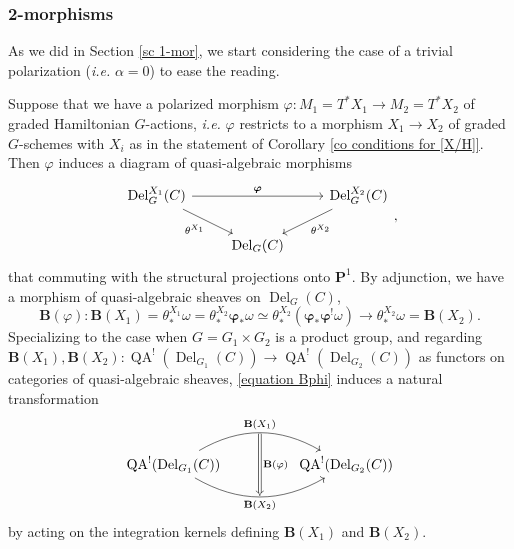 \documentclass[11pt, a4paper]{amsart}
\numberwithin{equation}{section}
\theoremstyle{definition}
\theoremstyle{remark}
\DeclareMathOperator{\Del}{Del}
\DeclareMathOperator{\QA}{QA}
\newcommand{\bB}{\mathbf{B}}
\renewcommand{\P}{\mathbf{P}}
\renewcommand{\to}{\longrightarrow}
\begin{document}
\subsubsection{2-morphisms} \label{sc 2-mor}

As we did in Section \ref{sc 1-mor}, we start considering the case of a trivial polarization ({\it i.e.} $\alpha = 0$) to ease the reading.

Suppose that we have a polarized morphism $\varphi: M_1 = T^*X_1 \to M_2 = T^*X_2$ of graded Hamiltonian $G$-actions, {\it i.e.} $\varphi$ restricts to a morphism $X_1 \to X_2$ of graded $G$-schemes with $X_i$ as in the statement of Corollary \ref{co conditions for [X/H]}. Then $\varphi$ induces a diagram of quasi-algebraic morphisms 
\begin{equation}
    \begin{tikzcd}
	{\Del_G^{X_1}(C)} && {\Del_G^{X_2}(C)} \\
	& {\Del_G(C)}
	\arrow["{\boldsymbol{\varphi}}", from=1-1, to=1-3]
	\arrow["{\theta^{X_1}}"', from=1-1, to=2-2]
	\arrow["{\theta^{X_2}}", from=1-3, to=2-2]
\end{tikzcd},
\end{equation}
that commuting with the structural projections onto $\P^1$. By adjunction, we have a morphism of quasi-algebraic sheaves on $\Del_G(C)$,
\begin{equation} \label{equation Bphi}
\bB(\varphi):\bB(X_1) = \theta_{*}^{X_1}\omega = \theta_{*}^{X_2}\boldsymbol\varphi_*\omega \simeq \theta_{*}^{X_2}(\boldsymbol\varphi_*\boldsymbol\varphi^!\omega) \to \theta_{*}^{X_2}\omega = \bB(X_2).
\end{equation}
Specializing to the case when $G = G_1 \times G_2$ is a product group, and regarding $\bB(X_1), \bB(X_2): \QA^!(\Del_{G_1}(C)) \to \QA^!(\Del_{G_2}(C))$ as functors on categories of quasi-algebraic sheaves, \eqref{equation Bphi} induces a natural transformation
\begin{equation}
    \begin{tikzcd}
	{\QA^!(\Del_{G_1}(C))} && {\QA^!(\Del_{G_2}(C))}
	\arrow[""{name=0, anchor=center, inner sep=0}, "{\bB(X_1)}", bend left, from=1-1, to=1-3]
	\arrow[""{name=1, anchor=center, inner sep=0}, "{\bB(X_2)}"', bend right, from=1-1, to=1-3]
	\arrow["{\bB(\varphi)}", Rightarrow, from=0, to=1]
\end{tikzcd}
\end{equation}
by acting on the integration kernels defining $\bB(X_1)$ and $\bB(X_2)$. 
\end{document}
